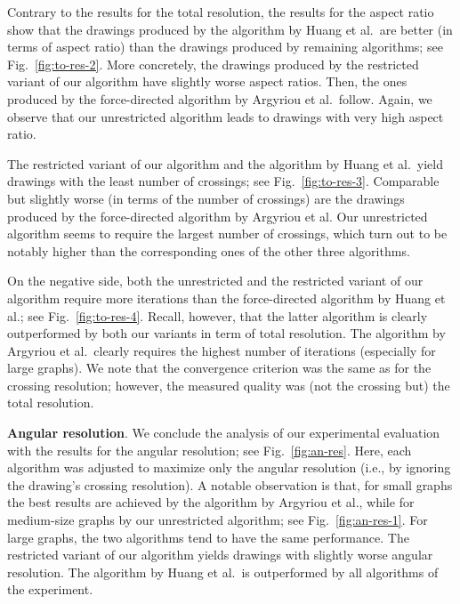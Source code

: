 \documentclass[runningheads]{llncs}
\newcommand{\myparagraph}[1]{\smallskip\noindent\textbf{#1}.}
\begin{document}
Contrary to the results for the total resolution, the results for the aspect ratio show that the drawings produced by the algorithm by Huang et al.\ are better (in terms of aspect ratio) than the drawings produced by remaining algorithms; see Fig.~\ref{fig:to-res-2}. More concretely, the drawings produced by the restricted variant of our algorithm have slightly worse aspect ratios. Then, the ones produced by the force-directed algorithm by Argyriou et al.\ follow. Again, we observe that our unrestricted algorithm leads to drawings with very high aspect ratio.

The restricted variant of our algorithm and the algorithm by Huang et al.\ yield drawings with the least number of crossings; see Fig.~\ref{fig:to-res-3}. Comparable but slightly worse (in terms of the number of crossings) are the drawings produced by the force-directed algorithm by Argyriou et al. Our unrestricted algorithm seems to require the largest number of crossings, which turn out to be notably higher than the corresponding ones of the other three algorithms.

On the negative side, both the unrestricted and the restricted variant of our algorithm require more iterations than the  force-directed algorithm by Huang et al.; see Fig.~\ref{fig:to-res-4}. Recall, however, that the latter algorithm is clearly outperformed by both our variants in term of total resolution. The algorithm by Argyriou et al.\ clearly requires the highest number of iterations (especially for large graphs). We note that the convergence criterion was the same as for the crossing resolution; however, the measured quality was (not the crossing but) the total resolution.

\myparagraph{Angular resolution} We conclude the analysis of our experimental evaluation with the  results for the angular resolution; see Fig.~\ref{fig:an-res}. Here, each algorithm was adjusted  to maximize only the angular resolution (i.e., by ignoring the drawing's crossing resolution). A notable observation is that, for small graphs the best results are achieved by the algorithm by Argyriou et al., while for medium-size graphs by our unrestricted algorithm; see Fig.~\ref{fig:an-res-1}. For large graphs, the two algorithms tend to have the same performance. The restricted variant of our algorithm yields drawings with slightly worse angular resolution. The algorithm by Huang et al.\ is outperformed by all algorithms of the experiment.
\end{document}
